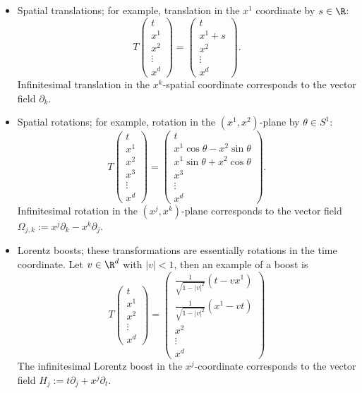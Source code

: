 \documentclass[reqno]{amsart}
\theoremstyle{definition}
\theoremstyle{remark}
\begin{document}
\begin{itemize}
	\item Spatial translations; for example, translation in the $x^1$ coordinate by $s \in \R$:
				\[ T\begin{pmatrix} t \\ x^1 \\ x^2\\ \vdots \\ x^d \end{pmatrix} =  \begin{pmatrix} t \\ x^1 + s \\ x^2 \\ \vdots  \\ x^d \end{pmatrix}.\]
			Infinitesimal translation in the $x^k$-spatial coordinate corresponds to the vector field $\partial_k$. 	
	
	\item Spatial rotations; for example, rotation in the $(x^1, x^2)$-plane by $\theta \in S^1$:
				\[
					T \begin{pmatrix} t \\ x^1 \\ x^2 \\ x^3 \\ \vdots \\ x^d \end{pmatrix}
					=
					\begin{pmatrix} t \\ x^1 \cos \theta  -x^2 \sin \theta  \\ x^1 \sin \theta  +  x^2 \cos \theta  \\  x^3 \\ \vdots \\ x^d \end{pmatrix}.
				\]
			Infinitesimal rotation in the $(x^j, x^k)$-plane corresponds to the vector field $\Omega_{j, k} := x^j \partial_k - x^k \partial_j$. 
	
	\item Lorentz boosts; these transformations are essentially rotations in the time coordinate. Let $v \in \R^d$ with $|v| < 1$, then an example of a boost is
				\[
					T
					\begin{pmatrix} t \\ x^1 \\ x^2 \\ \vdots \\ x^d \end{pmatrix}
					 = \begin{pmatrix} \frac{1}{\sqrt{1 - |v|^2}} (t - v x^1) \\  \frac{1}{\sqrt{1 - |v|^2}} (x^1 - v t) \\ x^2 \\ \vdots \\ x^d \end{pmatrix}
				 \]
			The infinitesimal Lorentz boost in the $x^j$-coordinate corresponds to the vector field $H_j := t \partial_j + x^j \partial_t$. 	 
\end{itemize}
\end{document}
